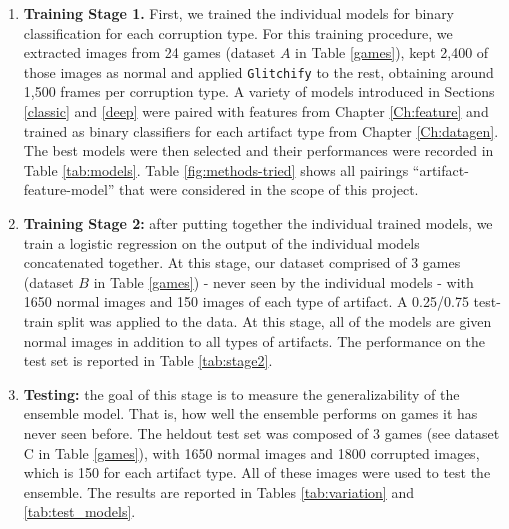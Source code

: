 \begin{enumerate}
    \item \textbf{Training Stage 1.} First, we trained the individual models for binary classification for each corruption type. For this training procedure, we extracted images from 24 games (dataset $A$ in Table \ref{games}), kept 2,400 of those images as normal and applied \texttt{Glitchify} to the rest, obtaining around 1,500 frames per corruption type. A variety of models introduced in Sections \ref{classic} and \ref{deep} were paired with features from Chapter \ref{Ch:feature} and trained as binary classifiers for each artifact type from Chapter \ref{Ch:datagen}. The best models were then selected and their performances were recorded in Table \ref{tab:models}. Table \ref{fig:methods-tried} shows all pairings ``artifact-feature-model'' that were considered in the scope of this project.
    
    \item \textbf{Training Stage 2:} after putting together the individual trained models, we train a logistic regression on the output of the individual models concatenated together. At this stage, our dataset comprised of 3 games (dataset $B$ in Table \ref{games}) - never seen by the individual models - with 1650 normal images and 150 images of each type of artifact. A 0.25/0.75 test-train split was applied to the data. At this stage, all of the models are given normal images in addition to all types of artifacts. The performance on the test set is reported in Table \ref{tab:stage2}.
    \item \textbf{Testing:} the goal of this stage is to measure the generalizability of the ensemble model. That is, how well the ensemble performs on games it has never seen before. The heldout test set was composed of 3 games (see dataset C in Table \ref{games}), with 1650 normal images and 1800 corrupted images, which is 150 for each artifact type. All of these images were used to test the ensemble. The results are reported in Tables \ref{tab:variation} and \ref{tab:test_models}.
\end{enumerate}

\newpage

